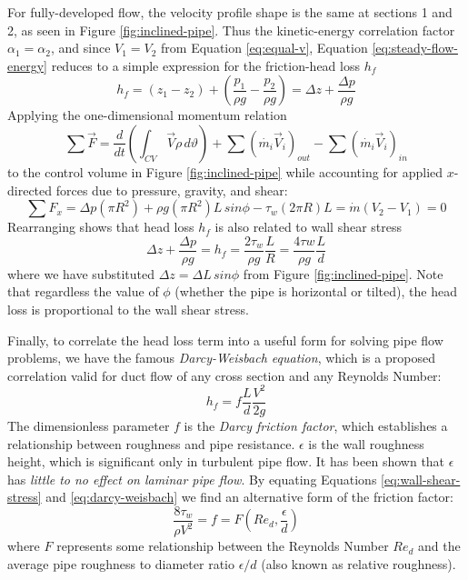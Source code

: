 \documentclass[11pt]{article} %
\numberwithin{equation}{section} %
\begin{document}
For fully-developed flow, the velocity profile shape is the same at sections 1 and 2, as seen in Figure \ref{fig:inclined-pipe}. Thus the kinetic-energy correlation factor $\alpha_{1} = \alpha_{2}$, and since $V_{1} = V_{2}$ from Equation \ref{eq:equal-v}, Equation \ref{eq:steady-flow-energy} reduces to a simple expression for the friction-head loss $h_{f}$ \cite{fluid-mechanics}
\begin{equation}
h_{f} = (z_{1} - z_{2}) + \left( \frac{p_{1}}{\rho g} - \frac{p_{2}}{\rho g} \right) = \Delta z + \frac{\Delta p}{\rho g}
\end{equation}
Applying the one-dimensional momentum relation
\begin{equation}
\sum \vec{F} = \frac{d}{dt} \left( \int_{CV} \vec{V} \rho\, d\vartheta \right) + \sum (\dot{m_{i}} \vec{V}_{i})_{out} - \sum (\dot{m_{i}} \vec{V}_{i})_{in}
\end{equation}
to the control volume in Figure \ref{fig:inclined-pipe} while accounting for applied $x$-directed forces due to pressure, gravity, and shear:
\begin{equation}
\sum F_{x} = \Delta p (\pi R^{2}) + \rho g (\pi R^{2}) L\, sin \phi - \tau_{w}(2 \pi R)L = \dot{m} (V_{2} - V_{1}) = 0
\end{equation}
Rearranging shows that head loss $h_{f}$ is also related to wall shear stress
\begin{equation} \label{eq:wall-shear-stress}
\Delta z + \frac{\Delta p}{\rho g} = h_{f} = \frac{2 \tau_{w}}{\rho g} \frac{L}{R} = \frac{4 \tau{w}}{\rho g} \frac{L}{d}
\end{equation}
where we have substituted $\Delta z = \Delta L\, sin \phi$ from Figure \ref{fig:inclined-pipe}. Note that regardless the value of $\phi$ (whether the pipe is horizontal or tilted), the head loss is proportional to the wall shear stress.

Finally, to correlate the head loss term into a useful form for solving pipe flow problems, we have the famous \textit{Darcy-Weisbach equation}, which is a proposed correlation valid for duct flow of any cross section and any Reynolds Number:
\begin{equation} \label{eq:darcy-weisbach}
h_{f} = f{\frac{L}{d}}{\frac{V^{2}}{2{g}}}
\end{equation}
The dimensionless parameter $f$ is the \textit{Darcy friction factor}, which establishes a relationship between roughness and pipe resistance. $\epsilon$ is the wall roughness height, which is significant only in turbulent pipe flow. It has been shown that $\epsilon$ has \textit{little to no effect on laminar pipe flow}. By equating Equations \ref{eq:wall-shear-stress} and \ref{eq:darcy-weisbach} we find an alternative form of the friction factor:
\begin{equation} \label{eq:darcy-friction}
\frac{8 \tau_{w}}{\rho V^{2}} = f = F(Re_{d}, \frac{\epsilon}{d})
\end{equation}
where $F$ represents some relationship between the Reynolds Number $Re_{d}$ and the average pipe roughness to diameter ratio $\epsilon / d$ (also known as relative roughness).
\end{document}
